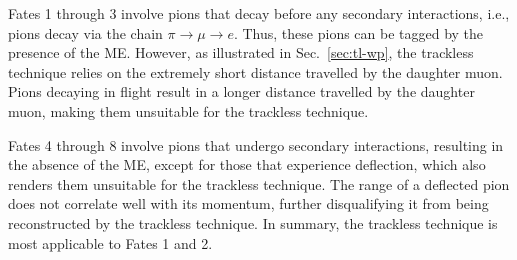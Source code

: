           Fates 1 through 3 involve pions that decay before any secondary interactions, i.e., pions decay via the chain $\pi \rightarrow \mu \rightarrow e$. 
          Thus, these pions can be tagged by the presence of the ME. 
          However, as illustrated in Sec.~\ref{sec:tl-wp}, the trackless technique relies on the extremely short distance travelled by the daughter muon. 
          Pions decaying in flight result in a longer distance travelled by the daughter muon, making them unsuitable for the trackless technique.

          Fates 4 through 8 involve pions that undergo secondary interactions, resulting in the absence of the ME, except for those that experience deflection, which also renders them unsuitable for the trackless technique. 
          The range of a deflected pion does not correlate well with its momentum, further disqualifying it from being reconstructed by the trackless technique. 
          In summary, the trackless technique is most applicable to Fates 1 and 2.

